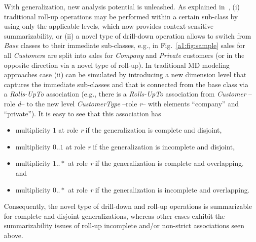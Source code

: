 With generalization, new analysis potential is unleashed.  As
explained in~\cite{DBLP:journals/is/LechtenborgerV03}, (i)
traditional roll-up operations may be performed within a certain
sub-class by using only the applicable levels, which now provides
context-sensitive summarizability, or (ii) a novel type of
drill-down operation allows to switch from \emph{Base} classes to
their immediate sub-classes, e.g., in Fig.~\ref{a1:fig:sample} sales
for all \textit{Customer}s are split into sales for \textit{Company}
and \textit{Private} customers (or in the opposite direction via a
novel type of roll-up).  In traditional MD modeling approaches case
(ii) can be simulated by introducing a new dimension level that
captures the immediate sub-classes and that is connected from the
base class via a \emph{Rolls-UpTo} association (e.g., there is a
\emph{Rolls-UpTo} association from \textit{Customer} --role
\emph{d}-- to the new level \textit{CustomerType} --role \emph{r}--
with elements ``company'' and ``private'').  It is easy to see that
this association has
\begin{itemize}
\item multiplicity $1$ at role \emph{r} if the generalization is complete and
  disjoint,
\item multiplicity $0..1$ at role \emph{r} if the generalization is incomplete
  and disjoint,
\item multiplicity $1..*$ at role \emph{r} if the generalization is complete
  and overlapping, and
\item multiplicity $0..*$ at role \emph{r} if the generalization is incomplete
  and overlapping.
\end{itemize}
Consequently, the novel type of drill-down and roll-up operations is
summarizable for complete and disjoint generalizations, whereas
other cases exhibit the summarizability issues of roll-up incomplete
and/or non-strict associations seen above.


